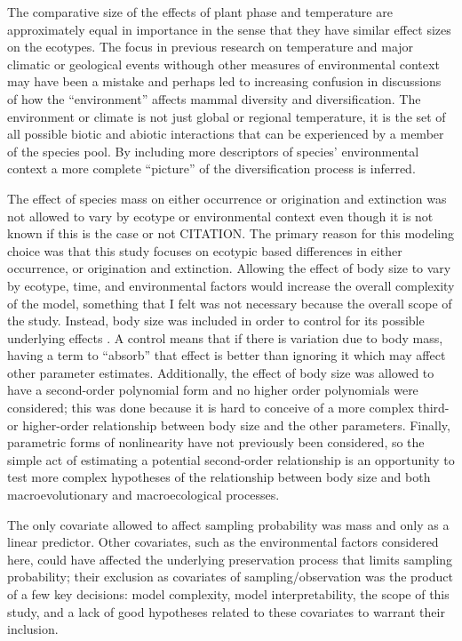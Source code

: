 \documentclass[12pt,letterpaper]{article}
\begin{document}
The comparative size of the effects of plant phase and temperature are approximately equal in importance in the sense that they have similar effect sizes on the ecotypes. The focus in previous research on temperature and major climatic or geological events withough other measures of environmental context may have been a mistake and perhaps led to increasing confusion in discussions of how the ``environment'' affects mammal diversity and diversification. The environment or climate is not just global or regional temperature, it is the set of all possible biotic and abiotic interactions that can be experienced by a member of the species pool. By including more descriptors of species' environmental context a more complete ``picture'' of the diversification process is inferred.


The effect of species mass on either occurrence or origination and extinction was not allowed to vary by ecotype or environmental context even though it is not known if this is the case or not CITATION. The primary reason for this modeling choice was that this study focuses on ecotypic based differences in either occurrence, or origination and extinction. Allowing the effect of body size to vary by ecotype, time, and environmental factors would increase the overall complexity of the model, something that I felt was not necessary because the overall scope of the study. Instead, body size was included in order to control for its possible underlying effects \citep{McElreath2016}. A control means that if there is variation due to body mass, having a term to ``absorb'' that effect is better than ignoring it which may affect other parameter estimates. Additionally, the effect of body size was allowed to have a second-order polynomial form and no higher order polynomials were considered; this was done because it is hard to conceive of a more complex third- or higher-order relationship between body size and the other parameters. Finally, parametric forms of nonlinearity have not previously been considered, so the simple act of estimating a potential second-order relationship is an opportunity to test more complex hypotheses of the relationship between body size and both macroevolutionary and macroecological processes.

The only covariate allowed to affect sampling probability was mass and only as a linear predictor. Other covariates, such as the environmental factors considered here, could have affected the underlying preservation process that limits sampling probability; their exclusion as covariates of sampling/observation was the product of a few key decisions: model complexity, model interpretability, the scope of this study, and a lack of good hypotheses related to these covariates to warrant their inclusion. %
\end{document}
